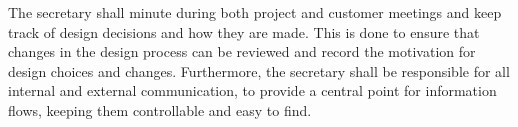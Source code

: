 	The secretary shall minute during both project and customer meetings and keep track of design decisions and how they are made. This is done to ensure that changes in the design process can be reviewed and record the motivation for design choices and changes. Furthermore, the secretary shall be responsible for all internal and external communication, to provide a central point for information flows, keeping them controllable and easy to find.